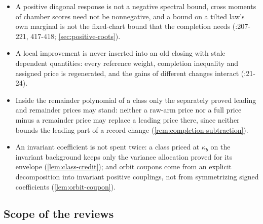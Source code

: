 \begin{itemize}
 $a,b$ the two-pin kernel has the Rayleigh quotient $-q+4q^2-3q^3$, of order $q$,
 while on the mean-zero functions supported off the pins its norm is at most
 $2qr+3q^2$
 (:114-152).
\item A positive diagonal response is not a negative spectral bound, cross
 moments of chamber scores need not be nonnegative, and a bound on a tilted law's
 own marginal is not the fixed-chart bound that the completion needs
 (:207-221, 417-418;
 \cref{sec:positive-roots}).
\item A local improvement is never inserted into an old closing with stale
 dependent quantities: every reference weight, completion inequality and
 assigned price is regenerated, and the gains of different changes interact
 (:21-24).
\item Inside the remainder polynomial of a class only the separately proved
 leading and remainder prices may stand: neither a raw-arm price nor a full price
 minus a remainder price may replace a leading price there, since neither bounds
 the leading part of a record change (\cref{rem:completion-subtraction}).
\item An invariant coefficient is not spent twice: a class priced at $\kappa_b$
 on the invariant background keeps only the variance allocation proved for its
 envelope (\cref{lem:class-credit}); and orbit coupons come from an explicit
 decomposition into invariant positive couplings, not from symmetrizing signed
 coefficients (\cref{lem:orbit-coupon}).
\end{itemize}

\subsection{Scope of the reviews}\label{subsec:obs:reviews}

